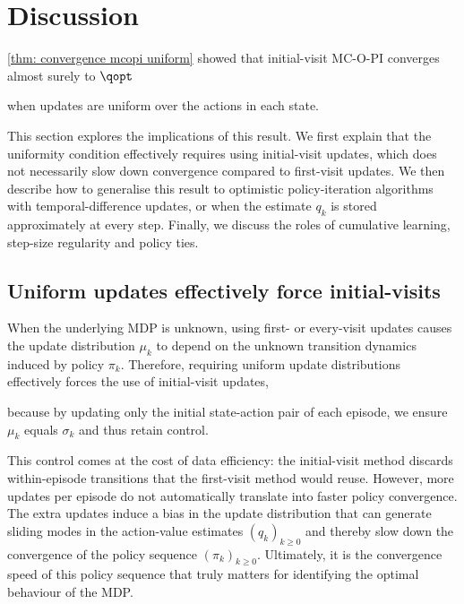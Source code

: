
\section{Discussion}
\label{sec: discussion}

\autoref{thm: convergence mcopi uniform} showed that initial-visit MC-O-PI converges almost surely to $\qopt$ 

when updates are uniform over the actions in each state.








This section explores the implications of this result.
We first explain that the uniformity condition effectively requires using initial-visit updates, which does not necessarily slow down convergence compared to first-visit updates.
We then describe how to generalise this result to optimistic policy-iteration algorithms with temporal-difference updates, or when the estimate $q_k$ is stored approximately at every step.
Finally, we discuss the roles of cumulative learning, step-size regularity and policy ties.








\subsection{Uniform updates effectively force initial-visits}


When the underlying MDP is unknown, using first- or every-visit updates causes the update distribution $\mu_k$ to depend on the unknown transition dynamics induced by policy $\pi_k$.
Therefore, requiring uniform update distributions effectively forces the use of initial-visit updates,

because by updating only the initial state-action pair of each episode, we ensure $\mu_k$ equals $\sigma_k$ and thus retain control.

This control comes at the cost of data efficiency: the initial-visit method discards within-episode transitions that the first-visit method would reuse. However, more updates per episode do not automatically translate into faster policy convergence.
The extra updates induce a bias in the update distribution that can generate sliding modes in the action-value estimates $(q_k)_{k \ge 0}$ and thereby slow down the convergence of the policy sequence $(\pi_k)_{k \ge 0}$. Ultimately, it is the convergence speed of this policy sequence that truly matters for identifying the optimal behaviour of the MDP.


